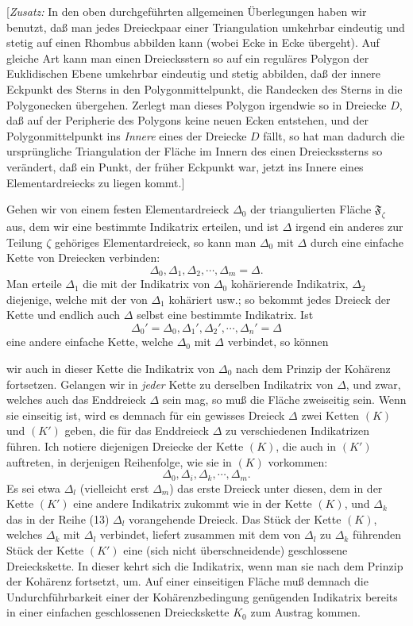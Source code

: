 \documentclass{article}
\begin{document}
[\emph{Zusatz:} In den oben durchgeführten allgemeinen Überlegungen haben wir benutzt, daß man jedes Dreieckpaar einer Triangulation umkehrbar eindeutig und stetig auf einen Rhombus abbilden kann (wobei Ecke in Ecke übergeht). Auf gleiche Art kann man einen Dreiecksstern so auf ein reguläres Polygon der Euklidischen Ebene umkehrbar eindeutig und stetig abbilden, daß der innere Eckpunkt des Sterns in den Polygonmittelpunkt, die Randecken des Sterns in die Polygonecken übergehen. Zerlegt man dieses Polygon irgendwie so in Dreiecke $D$, daß auf der Peripherie des Polygons keine neuen Ecken entstehen, und der Polygonmittelpunkt ins \emph{Innere} eines der Dreiecke $D$ fällt, so hat man dadurch die ursprüngliche Triangulation der Fläche im Innern des einen Dreieckssterns so verändert, daß ein Punkt, der früher Eckpunkt war, jetzt ins Innere eines Elementardreiecks zu liegen kommt.]

Gehen wir von einem festen Elementardreieck $\Delta_0$ der triangulierten Fläche $\mathfrak{F}_\zeta$ aus, dem wir eine bestimmte Indikatrix erteilen, und ist $\Delta$ irgend ein anderes zur Teilung $\zeta$ gehöriges Elementardreieck, so kann man $\Delta_0$ mit $\Delta$ durch eine einfache Kette von Dreiecken verbinden:
\[ \Delta_0, \Delta_1, \Delta_2, \cdots, \Delta_m = \Delta. \tag{K} \]
Man erteile $\Delta_1$ die mit der Indikatrix von $\Delta_0$ kohärierende Indikatrix, $\Delta_2$ diejenige, welche mit der von $\Delta_1$ kohäriert usw.; so bekommt jedes Dreieck der Kette und endlich auch $\Delta$ selbst eine bestimmte Indikatrix. Ist
\[ \Delta_0' = \Delta_0, \Delta_1', \Delta_2', \cdots, \Delta_n' = \Delta \tag{K'} \]
eine andere einfache Kette, welche $\Delta_0$ mit $\Delta$ verbindet, so können

wir auch in dieser Kette die Indikatrix von $\Delta_0$ nach dem Prinzip der Kohärenz fortsetzen. Gelangen wir in \emph{jeder} Kette zu derselben Indikatrix von $\Delta$, und zwar, welches auch das Enddreieck $\Delta$ sein mag, so muß die Fläche zweiseitig sein. Wenn sie einseitig ist, wird es demnach für ein gewisses Dreieck $\Delta$ zwei Ketten $(K)$ und $(K')$ geben, die für das Enddreieck $\Delta$ zu verschiedenen Indikatrizen führen. Ich notiere diejenigen Dreiecke der Kette $(K)$, die auch in $(K')$ auftreten, in derjenigen Reihenfolge, wie sie in $(K)$ vorkommen:
\[ \Delta_0, \Delta_i, \Delta_k, \cdots, \Delta_m. \tag{13} \]
Es sei etwa $\Delta_l$ (vielleicht erst $\Delta_m$) das erste Dreieck unter diesen, dem in der Kette $(K')$ eine andere Indikatrix zukommt wie in der Kette $(K)$, und $\Delta_k$ das in der Reihe (13) $\Delta_l$ vorangehende Dreieck. Das Stück der Kette $(K)$, welches $\Delta_k$ mit $\Delta_l$ verbindet, liefert zusammen mit dem von $\Delta_l$ zu $\Delta_k$ führenden Stück der Kette $(K')$ eine (sich nicht überschneidende) geschlossene Dreieckskette. In dieser kehrt sich die Indikatrix, wenn man sie nach dem Prinzip der Kohärenz fortsetzt, um. Auf einer einseitigen Fläche muß demnach die Undurchführbarkeit einer der Kohärenzbedingung genügenden Indikatrix bereits in einer einfachen geschlossenen Dreieckskette $K_0$ zum Austrag kommen.
\end{document}
